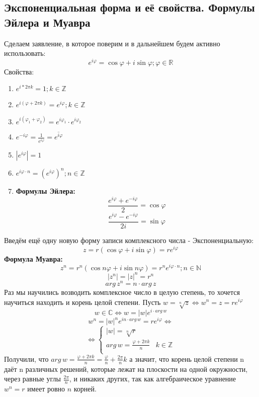 \subsection{Экспоненциальная форма и её свойства. Формулы Эйлера и Муавра}

Сделаем заявление, в которое поверим и в дальнейшем будем активно использовать:
$$e^{i\varphi}=\cos{\varphi} + i\sin{\varphi}; \varphi\in\mathbb{R}$$
Свойства:
\begin{enumerate}
    \item $e^{i*2\pi k} = 1; k\in\mathbb{Z}$
    \item $e^{i(\varphi + 2\pi k)} = e^{i\varphi}; k\in\mathbb{Z}$
    \item $e^{i(\varphi_1 + \varphi_2)} = e^{i\varphi_1} \cdot e^{i\varphi_2}$
    \item $e^{-i\varphi} = \frac{1}{e^{i\varphi}} = \overline{e^{i\varphi}}$
    \item $|e^{i\varphi}| = 1$
    \item $e^{i\varphi \cdot n} = (e^{i\varphi})^n; n\in\mathbb{Z}$
    \item \textbf{Формулы Эйлера:}
          $$\frac{e^{i\varphi}+e^{-i\varphi}}{2}=\cos{\varphi}$$
          $$\frac{e^{i\varphi}-e^{-i\varphi}}{2i}=\sin{\varphi}$$
\end{enumerate}

Введём ещё одну новую форму записи комплексного числа - Экспоненциальную:
$$z=r(\cos{\varphi}+i\sin{\varphi})=re^{i\varphi}$$
\textbf{Формула Муавра:}
$$z^n=r^n(\cos{n\varphi} + i\sin{n\varphi})=r^ne^{i\varphi \cdot n}; n\in\mathbb{N}$$
$$|z^n|=|z|^n=r^n$$
$$arg\,z^n=n \cdot arg\,z$$
Раз мы научились возводить комплексное число в целую степень, то хочется научиться находить и корень целой степени. Пусть $w=\sqrt[n]{z} \Leftrightarrow w^n=z=re^{i\varphi}$
$$w\in\mathbb{C}\Leftrightarrow w=|w|e^{i \cdot arg\,w}$$
$$w^n=|w|^ne^{in \cdot arg\,w}=re^{i\varphi} \Leftrightarrow$$
$$\Leftrightarrow
    \begin{cases}
        |w|=\sqrt[n]{r}                                  \\
        arg\,w=\frac{\varphi+2\pi k}{n} & k\in\mathbb{Z} \\
    \end{cases}
$$
Получили, что $arg\,w=\frac{\varphi+2\pi k}{n}=\frac{\varphi}{n} + \frac{2\pi}{n}k$ а значит, что корень целой степени n даёт n различных решений, которые лежат на плоскости на одной окружности, через равные углы $\frac{2\pi}{n}$, и никаких других, так как алгебраическое уравнение $ w^n = r $ имеет ровно $n$ корней.

